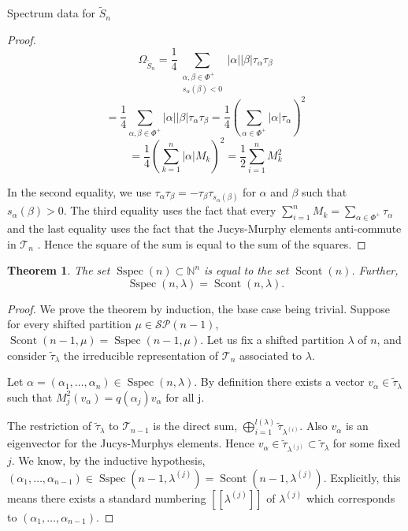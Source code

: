 \documentclass[a4paper,10pt]{amsart}
\newtheorem{theorem}{Theorem}[section]
\DeclareMathOperator{\Sspec}{Sspec}
\DeclareMathOperator{\Scont}{Scont}
\begin{document}
\begin{section}{Spectrum data for $\tilde{S}_n$}
\begin{proof}
$$\Omega_{\tilde{S}_n}= \frac{1}{4}\sum_{\substack{\alpha,\beta\in\Phi^+ \\ s_\alpha(\beta)<0}} |\alpha||\beta|\tau_\alpha \tau_\beta $$
 $$=\frac{1}{4}\sum_{\alpha,\beta\in \Phi^+} |\alpha||\beta|\tau_\alpha \tau_\beta= \frac{1}{4}(\sum_{\alpha\in\Phi^+}|\alpha|\tau_\alpha)^2$$
 $$=\frac{1}{4} (\sum_{k=1}^{n}|\alpha|M_k)^2= \frac{1}{2} \sum_{i=1}^n M_k^2$$
 
In the second equality, we use $\tau_\alpha \tau_\beta = - \tau_\beta \tau_{s_\alpha(\beta)}$ for $\alpha$ and $\beta$ such that $s_\alpha(\beta)>0$.
The third equality uses the fact that every $\sum_{i=1}^n M_k = \sum_{\alpha \in \Phi^+} \tau_\alpha$ and the last equality uses the fact that the Jucys-Murphy elements anti-commute in $\mathcal{T}_n$ \cite[3.1]{BK01}. Hence the square of the sum is equal to the sum of the squares. 
\end{proof}

\begin{theorem}\label{spectrumdata} The set $\Sspec(n) \subset \mathbb{N}^n$ is equal to the set $\Scont(n)$. Further,
$$\Sspec(n,\lambda) = \Scont(n,\lambda).$$ 

\end{theorem} 


\begin{proof}

We prove the theorem by induction, the base case being trivial. Suppose for every shifted partition $\mu \in \mathcal{SP}(n-1)$, $\Scont(n-1, \mu) = \Sspec(n-1, \mu)$. %
Let us fix a shifted partition $\lambda$ of $n$, and consider $\tilde{\tau}_\lambda$ the irreducible representation of $\mathcal{T}_n$ associated to $\lambda$.


Let $\alpha = (\alpha_1,\ldots ,\alpha_n)\in \Sspec(n , \lambda)$. By definition there exists a vector $v_\alpha \in \tilde{\tau}_\lambda$ such that $M_j^2(v_\alpha) =q(\alpha_j )v_\alpha \text{ for all } $j$.$  


The restriction of $\tilde{\tau}_\lambda$ to $\mathcal{T}_{n-1}$ is the direct sum, $\bigoplus_{i =1}^{l(\lambda)} \tilde{\tau}_{\lambda^{(i)}}$. Also $v_\alpha$ is an eigenvector for the Jucys-Murphys elements. Hence $v_\alpha \in \tilde{\tau}_{\lambda^{(j)}} \subset \tilde{\tau}_\lambda$ for some fixed $j$. We know, by the inductive hypothesis, $(\alpha_1,\ldots ,\alpha_{n-1}) \in \Sspec(n-1,\lambda^{(j)}) = \Scont(n-1,\lambda^{(j)})$. Explicitly, this means there exists a standard numbering $[[\lambda^{(j)}]]$ of $\lambda^{(j)}$ which corresponds to $(\alpha_1,\ldots ,\alpha_{n-1})$. 


\end{proof}
\end{section}
\end{document}
